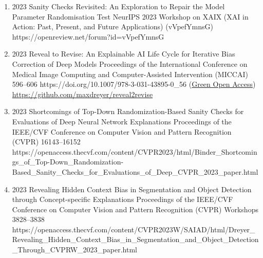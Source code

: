 {\begin{enumerate}
        \item {}
                            {2023}
                            {Sanity Checks Revisited: An Exploration to Repair the Model Parameter Randomisation Test}
                            {NeurIPS 2023 Workshop on XAIX (XAI in Action: Past, Present, and Future Applications)}
                            {(vVpefYmnsG)}
                            {https://openreview.net/forum?id=vVpefYmnsG} 

        \item {}
                            {2023}
                            {Reveal to Revise: An Explainable AI Life Cycle for Iterative Bias Correction of Deep Models}
                            {Proceedings of the International Conference on Medical Image Computing and Computer-Assisted Intervention (MICCAI)}
                            {596--606}
                            {https://doi.org/10.1007/978-3-031-43895-0_56}
                            {(\href{https://arxiv.org/abs/2303.12641}{Green Open Access})\\ \href{https://github.com/maxdreyer/reveal2revise}{https://github.com/maxdreyer/reveal2revise}}


        \item {}
                            {2023}
                            {Shortcomings of Top-Down Randomization-Based Sanity Checks for Evaluations of Deep Neural Network Explanations}
                            {Proceedings of the IEEE/CVF Conference on Computer Vision and Pattern Recognition (CVPR)}
                            {16143--16152}
                            {https://openaccess.thecvf.com/content/CVPR2023/html/Binder_Shortcomings_of_Top-Down_Randomization-Based_Sanity_Checks_for_Evaluations_of_Deep_CVPR_2023_paper.html}

        \item {}
                            {2023}
                            {Revealing Hidden Context Bias in Segmentation and Object Detection through Concept-specific Explanations}
                            {Proceedings of the IEEE/CVF Conference on Computer Vision and Pattern Recognition (CVPR) Workshops}
                            {3828--3838}
                            {https://openaccess.thecvf.com/content/CVPR2023W/SAIAD/html/Dreyer_Revealing_Hidden_Context_Bias_in_Segmentation_and_Object_Detection_Through_CVPRW_2023_paper.html}


\end{enumerate}}
